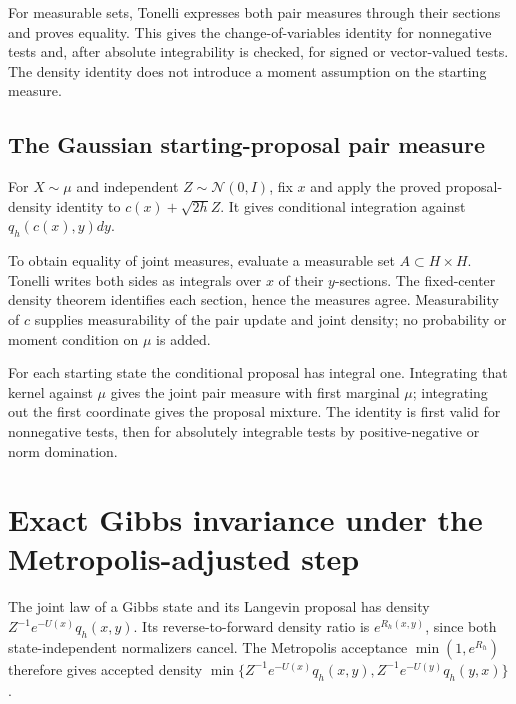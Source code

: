 \documentclass[11pt,a4paper]{report}
\begin{document}
For measurable sets, Tonelli expresses both pair measures through their sections and proves equality. This gives the change-of-variables identity for nonnegative tests and, after absolute integrability is checked, for signed or vector-valued tests. The density identity does not introduce a moment assumption on the starting measure.

\subsection{\texorpdfstring{The Gaussian starting-proposal pair measure}{The Gaussian starting-proposal pair measure}}
\label{report-step-UnadjustedLangevin-GaussianProposalPairDensity-lean-1}


For \(X\sim\mu\) and independent \(Z\sim\mathcal N(0,I)\), fix \(x\) and apply the proved proposal-density identity to \(c(x)+\sqrt{2h}Z\). It gives conditional integration against \(q_h(c(x),y)dy\).



To obtain equality of joint measures, evaluate a measurable set \(A\subset H\times H\). Tonelli writes both sides as integrals over \(x\) of their \(y\)-sections. The fixed-center density theorem identifies each section, hence the measures agree. Measurability of \(c\) supplies measurability of the pair update and joint density; no probability or moment condition on \(\mu\) is added.



For each starting state the conditional proposal has integral one. Integrating that kernel against \(\mu\) gives the joint pair measure with first marginal \(\mu\); integrating out the first coordinate gives the proposal mixture. The identity is first valid for nonnegative tests, then for absolutely integrable tests by positive-negative or norm domination.

\section{\texorpdfstring{Exact Gibbs invariance under the Metropolis-adjusted step}{Exact Gibbs invariance under the Metropolis-adjusted step}}
\label{proof-module-UnadjustedLangevin-MALAInvariance-lean}


The joint law of a Gibbs state and its Langevin proposal has density \(Z^{-1}e^{-U(x)}q_h(x,y)\). Its reverse-to-forward density ratio is \(e^{R_h(x,y)}\), since both state-independent normalizers cancel. The Metropolis acceptance \(\min(1,e^{R_h})\) therefore gives accepted density \(\min\{Z^{-1}e^{-U(x)}q_h(x,y),Z^{-1}e^{-U(y)}q_h(y,x)\}\).
\end{document}
